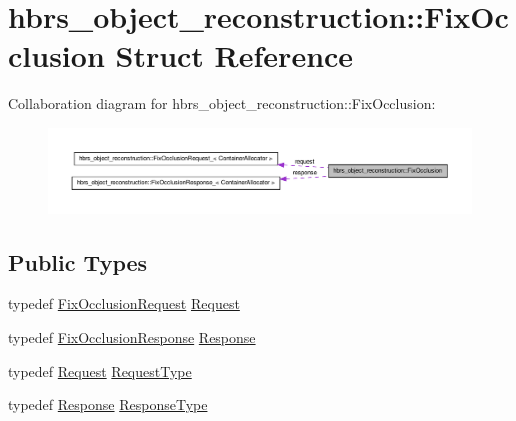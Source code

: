 \hypertarget{structhbrs__object__reconstruction_1_1_fix_occlusion}{\section{hbrs\-\_\-object\-\_\-reconstruction\-:\-:\-Fix\-Occlusion \-Struct \-Reference}
\label{structhbrs__object__reconstruction_1_1_fix_occlusion}
}


\-Collaboration diagram for hbrs\-\_\-object\-\_\-reconstruction\-:\-:\-Fix\-Occlusion\-:\nopagebreak
\begin{figure}[H]
\begin{center}
\leavevmode
\includegraphics[width=350pt]{structhbrs__object__reconstruction_1_1_fix_occlusion__coll__graph}
\end{center}
\end{figure}
\subsection*{\-Public \-Types}
\begin{DoxyCompactItemize}
\item 
typedef \hyperlink{namespacehbrs__object__reconstruction_a330d61c8057fd73ec5628a35f255636b}{\-Fix\-Occlusion\-Request} \hyperlink{structhbrs__object__reconstruction_1_1_fix_occlusion_ad84cf29b5ac08d5c38b9bff6021d8280}{\-Request}
\item 
typedef \hyperlink{namespacehbrs__object__reconstruction_a62a6d8a132bcd4fdf13bb7af257264ed}{\-Fix\-Occlusion\-Response} \hyperlink{structhbrs__object__reconstruction_1_1_fix_occlusion_a8f008499ed365ef31d51c0680d25a427}{\-Response}
\item 
typedef \hyperlink{structhbrs__object__reconstruction_1_1_fix_occlusion_ad84cf29b5ac08d5c38b9bff6021d8280}{\-Request} \hyperlink{structhbrs__object__reconstruction_1_1_fix_occlusion_a81b9e631834e62676196c5861be0d018}{\-Request\-Type}
\item 
typedef \hyperlink{structhbrs__object__reconstruction_1_1_fix_occlusion_a8f008499ed365ef31d51c0680d25a427}{\-Response} \hyperlink{structhbrs__object__reconstruction_1_1_fix_occlusion_a0c10bd2d3f7f922be7cdd7f4e141d16f}{\-Response\-Type}
\end{DoxyCompactItemize}
